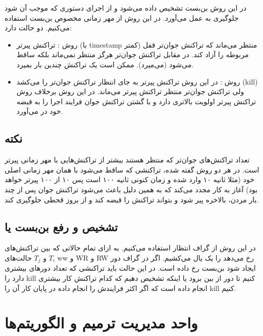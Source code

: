 \documentclass[a4paper]{article}
\begin{document}
در این روش بن‌بست تشخیص داده می‌شود و از اجرای دستوری که موجب آن شود جلوگیری به
عمل می‌آورد. در این روش از مهر زمانی مخصوص بن‌بست استفاده می‌کنیم. دو حالت دارد:

\begin{itemize}
    \item روش : تراکنش پیرتر (با timestamp کمتر) منتظر می‌ماند که
    تراکنش جوان‌تر قفل مربوطه را آزاد کند. در مقابل تراکنش جوان‌تر هرگز منتظر
    نمی‌ماند بلکه ساقط می‌شود (می‌میرد). ممکن است یک تراکنش چندین بار بمیرد.
    
    \item روش : در این روش تراکنش پیرتر به جای انتظار تراکنش
    جوان‌تر را می‌کشد (kill) ولی تراکنش جوان‌تر منتظر تراکنش پیرتر می‌ماند. در
    این روش برخلاف روش  تراکنش پیرتر اولویت بالاتری دارد و با گشتن
    تراکنش جوان فرایند اجرا را به قبضه خود در می‌آورد.
\end{itemize}

\subsection*{نکته}

تعداد تراکنش‌های جوان‌تر که منتظر هستند بیشتر از تراکنش‌هایی با مهر زمانی پیرتر
است. در هر دو روش گفته شده، تراکنشی که ساقط می‌شود با همان مهر زمانی اصلی خود
(مثلا ثانیه ۱۰ وارد شده و زمان کنونی ثانیه ۱۰۰ است پس ۱۰ از ۱۰۰ پیرتر خواهد بود)
آغاز به کار مجدد می‌کند که به همین دلیل باعث می‌شود تراکنش جوان پس از چند بار
مردن، بالاخره پیر شود و بتواند تراکنش را قبضه کند و از بروز قحطی جلوگیری کند.

\subsection{تشخیص و رفع بن‌بست یا }

در این روش از گراف انتظار استفاده می‌کنیم. به ازای تمام حالاتی‌ که بین
تراکنش‌های $T_i$ و $T_j$ حالت‌های ww و WR و RW رخ می‌دهد را یک یال می‌کشیم. اگر
در گراف دور ایجاد شود بن‌بست رخ داده است. در این حالت باید تراکنشی که تعداد
دور‌های بیشتری دارد را kill کنیم تا دور از بین برود یا اینکه تشخیص دهیم که کدام
تراکنش کار بیشتری انجام داده است که اگر اکثر فرایندش را انجام داده در پایان کار
آن را kill کنیم.

\newpage

\section{واحد مدیریت ترمیم و الگوریتم‌ها}
\end{document}
